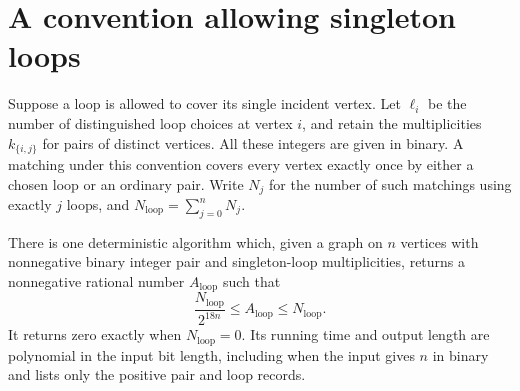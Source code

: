\section{A convention allowing singleton loops}
\label{c:app-loops}

Suppose a loop is allowed to cover its single incident vertex.
Let \(\ell_i\) be the number of distinguished loop choices at vertex
\(i\), and retain the multiplicities \(k_{\{i,j\}}\) for pairs of
distinct vertices.  All these integers are given in binary.
A matching under this convention covers every vertex exactly once by
either a chosen loop or an ordinary pair.
Write \(N_j\) for the number of such matchings using exactly \(j\)
loops, and \(N_{\mathrm{loop}}=\sum_{j=0}^n N_j\).

\begin{proposition}
\label{c:prop-loops}
There is one deterministic algorithm which, given a graph on \(n\)
vertices with nonnegative binary integer pair and singleton-loop
multiplicities, returns a nonnegative rational number
\(A_{\mathrm{loop}}\) such that
\[
             \frac{N_{\mathrm{loop}}}{2^{18n}}
                  \le A_{\mathrm{loop}}\le N_{\mathrm{loop}}.
\]
It returns zero exactly when \(N_{\mathrm{loop}}=0\).
Its running time and output length are polynomial in the input bit
length, including when the input gives \(n\) in binary and lists only
the positive pair and loop records.
\end{proposition}

